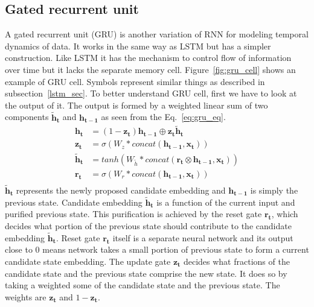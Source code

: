 \documentclass[10pt,twocolumn,letterpaper]{article}
\begin{document}
\subsection{Gated recurrent unit}
A gated recurrent unit (GRU) is another variation of RNN for modeling temporal dynamics of data. It works in the same way as LSTM
but has a simpler construction. Like LSTM it has the mechanism to control flow of information over time but it lacks the separate memory cell. 
Figure~\ref{fig:gru_cell} shows an example of GRU cell. Symbols represent similar things as described in subsection~\ref{lstm_sec}. 
To better understand GRU cell, first we have to look at the output of it. The output is formed by a weighted linear sum of two components $\mathbf{\tilde{h}_t}$ and $\mathbf{h_{t-1}}$ as seen from the Eq.~\ref{eq:gru_eq}. 
\begin{equation}
	\label{eq:gru_eq}
	\begin{aligned}
		\mathbf{h_t} & = (1-\mathbf{z_{t}})\mathbf{h_{t-1}} \oplus \mathbf{z_{t}}\mathbf{\tilde{h}_t} \\
		\mathbf{z_{t}} &= \sigma(W_z*concat(\mathbf{h_{t-1}}, \mathbf{x_t})) \\
		\mathbf{\tilde{h}_t} &= tanh(W_{\tilde{h}}*concat(\mathbf{r_t} \otimes \mathbf{h_{t-1}}, \mathbf{x_t})) \\
		\mathbf{r_t} &= \sigma(W_r*concat(\mathbf{h_{t-1}}, \mathbf{x_t})) \\
	\end{aligned}
\end{equation}
$\mathbf{\tilde{h}_t}$ represents the 
newly proposed candidate embedding and $\mathbf{h_{t-1}}$ is simply the previous state. Candidate embedding $\mathbf{\tilde{h}_t}$ is a function of the current input and purified previous state. This purification is achieved by the reset gate $\mathbf{r_t}$, which decides
what portion of the 
previous state should contribute to the 
candidate embedding $\mathbf{\tilde{h}_t}$. Reset gate $\mathbf{r_t}$ itself is a separate neural network and its output close to 0 means network takes a small portion of previous state to form a current candidate state embedding. The update gate $\mathbf{z_{t}}$ decides what fractions of the candidate state and the previous state comprise the new state. It does so by taking a weighted some of the candidate state and the previous state. The weights are $\mathbf{z_{t}}$ and $1-\mathbf{z_{t}}$. %
\end{document}
